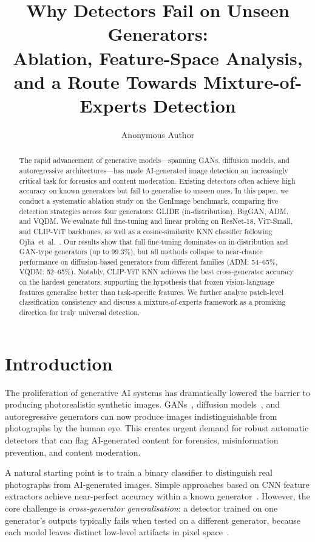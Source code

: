 \documentclass{article}
\title{Why Detectors Fail on Unseen Generators:\\
Ablation, Feature-Space Analysis, and a Route Towards Mixture-of-Experts Detection}
\author{
  Anonymous Author
}
\begin{document}
\maketitle


\begin{abstract}
The rapid advancement of generative models—spanning GANs, diffusion models, and autoregressive architectures—has made AI-generated image detection an increasingly critical task for forensics and content moderation.
Existing detectors often achieve high accuracy on known generators but fail to generalise to unseen ones.
In this paper, we conduct a systematic ablation study on the GenImage benchmark, comparing five detection strategies across four generators: GLIDE (in-distribution), BigGAN, ADM, and VQDM.
We evaluate full fine-tuning and linear probing on ResNet-18, ViT-Small, and CLIP-ViT backbones, as well as a cosine-similarity KNN classifier following Ojha~et~al.~\cite{ojha2023towards}.
Our results show that full fine-tuning dominates on in-distribution and GAN-type generators (up to 99.3\%), but all methods collapse to near-chance performance on diffusion-based generators from different families (ADM: 54--65\%, VQDM: 52--65\%).
Notably, CLIP-ViT KNN achieves the best cross-generator accuracy on the hardest generators, supporting the hypothesis that frozen vision-language features generalise better than task-specific features.
We further analyse patch-level classification consistency and discuss a mixture-of-experts framework as a promising direction for truly universal detection.
\end{abstract}


\section{Introduction}

The proliferation of generative AI systems has dramatically lowered the barrier to producing photorealistic synthetic images.
GANs~\cite{goodfellow2014gan}, diffusion models~\cite{dhariwal2021diffusion, rombach2022latent}, and autoregressive generators can now produce images indistinguishable from photographs by the human eye.
This creates urgent demand for robust automatic detectors that can flag AI-generated content for forensics, misinformation prevention, and content moderation.

A natural starting point is to train a binary classifier to distinguish real photographs from AI-generated images.
Simple approaches based on CNN feature extractors achieve near-perfect accuracy within a known generator~\cite{wang2020cnn}.
However, the core challenge is \emph{cross-generator generalisation}: a detector trained on one generator's outputs typically fails when tested on a different generator, because each model leaves distinct low-level artifacts in pixel space~\cite{ojha2023towards}.
\end{document}
